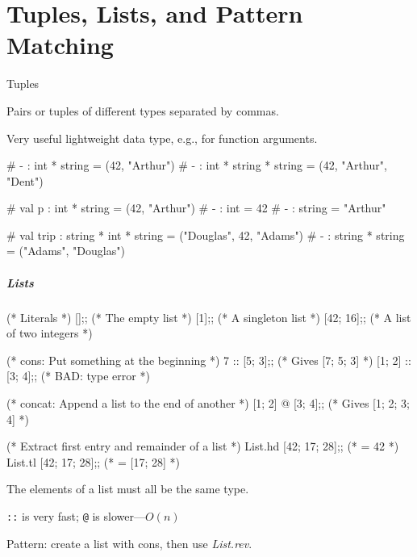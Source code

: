 \documentclass{plt}
\begin{document}
\part{Tuples, Lists, and Pattern Matching}
\frame{\partpage}

\begin{frame}[fragile]{Tuples}

Pairs or tuples of different types separated by commas.

Very useful lightweight data type, e.g., for function arguments.

\begin{interactive}
# 
- : int * string = (42, "Arthur")
# 
- : int * string * string = (42, "Arthur", "Dent")

# 
val p : int * string = (42, "Arthur")
# 
- : int = 42
# 
- : string = "Arthur"

# 
val trip : string * int * string = ("Douglas", 42, "Adams")
# 
- : string * string = ("Adams", "Douglas")
\end{interactive}


\end{frame}

\begin{frame}[fragile]
  \frametitle{Lists}
\begin{ocaml}
(* Literals *)
[];;               (* The empty list *)
[1];;              (* A singleton list *)
[42; 16];;         (* A list of two integers *)

(* cons: Put something at the beginning *)
7 :: [5; 3];;      (* Gives [7; 5; 3] *)
[1; 2] :: [3; 4];; (* BAD: type error *)

(* concat: Append a list to the end of another *)
[1; 2] @ [3; 4];;  (* Gives [1; 2; 3; 4] *)

(* Extract first entry and remainder of a list *)
List.hd [42; 17; 28];; (* = 42 *)
List.tl [42; 17; 28];; (* = [17; 28] *)
\end{ocaml}

The elements of a list must all be the same type.

\verb|::| is very fast; \verb|@| is slower---$O(n)$

Pattern: create a list with cons, then use \emph{List.rev}.

\end{frame}
\end{document}
